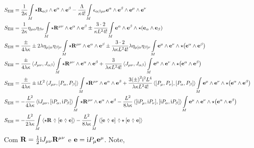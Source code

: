 \begin{align*}
    S_{\textnormal{EH}}&=\frac{1}{2\kappa}\int\limits_M\star\vb{R}_{\alpha\beta}\wedge\vb e^\alpha\wedge\vb e^\beta-\frac{\Lambda}{\kappa4!}\int\limits_M\epsilon_{\alpha\beta\mu\nu}\vb e^\alpha\wedge\vb e^\beta\wedge\vb e^\mu\wedge\vb e^\nu\\
    S_{\textnormal{EH}}&=\frac{1}{2\kappa}\eta_{\mu\alpha}\eta_{\beta\nu}\int\limits_M\star\vb{R}^{\mu\nu}\wedge\vb e^\alpha\wedge\vb e^\beta\pm\frac{3\cdot 2}{\kappa L^24!}\int\limits_M\vb e^\alpha\wedge\vb e^\beta\wedge\star\qty(\vb e_\alpha\wedge\vb e_\beta)\\
    S_{\textnormal{EH}}&=\frac{\pm}{4\lambda\kappa}\pm2\lambda\eta_{\mu[\alpha}\eta_{\beta]\nu}\int\limits_M\star\vb{R}^{\mu\nu}\wedge\vb e^\alpha\wedge\vb e^\beta\pm\frac{3\cdot 2}{\lambda\kappa L^24!}\lambda\eta_{\mu[\alpha}\eta_{\beta]\nu}\int\limits_M\vb e^\mu\wedge\vb e^\nu\wedge\star\qty(\vb e^\alpha\wedge\vb e^\beta)\\
    S_{\textnormal{EH}}&=\frac{\pm}{4\lambda\kappa}\expval{J_{\mu\nu},J_{\alpha\beta}}\int\limits_M\star\vb{R}^{\mu\nu}\wedge\vb e^\alpha\wedge\vb e^\beta+\frac{3}{\lambda\kappa L^24!}\expval{J_{\mu\nu},J_{\alpha\beta}}\int\limits_M\vb e^\mu\wedge\vb e^\nu\wedge\star\qty(\vb e^\alpha\wedge\vb e^\beta)\\
    S_{\textnormal{EH}}&=\frac{\pm}{4\lambda\kappa}\pm\im L ^2\expval{J_{\mu\nu},\comm{P_\alpha}{P_\beta}}\int\limits_M\star\vb{R}^{\mu\nu}\wedge\vb e^\alpha\wedge\vb e^\beta+\frac{3\qty(\pm)^2\im^2L^4}{\lambda\kappa L^24!}\expval{\comm{P_\mu}{P_\nu},\comm{P_\alpha}{P_\beta}}\int\limits_M\vb e^\mu\wedge\vb e^\nu\wedge\star\qty(\vb e^\alpha\wedge\vb e^\beta)\\
    S_{\textnormal{EH}}&=-\frac{L^2}{4\lambda\kappa}\expval{\im J_{\mu\nu},\comm{\im P_\alpha}{\im P_\beta}}\int\limits_M\star\vb{R}^{\mu\nu}\wedge\vb e^\alpha\wedge\vb e^\beta-\frac{L^2}{8\lambda\kappa}\expval{\comm{\im P_\mu}{\im P_\nu},\comm{\im P_\alpha}{\im P_\beta}}\int\limits_M\vb e^\mu\wedge\vb e^\nu\wedge\star\qty(\vb e^\alpha\wedge\vb e^\beta)\\
    S_{\textnormal{EH}}&=-\frac{L^2}{2\lambda\kappa}\int\limits_M\expval{\star\vb{R}\ \wedgecomma\ \wedgecomm{\vb e}{\vb e}}-\frac{L^2}{8\lambda\kappa}\int\limits_M\expval{\wedgecomm{\vb e}{\vb e}\ \wedgecomma \star\wedgecomm{\vb e}{\vb e}}
\end{align*}
Com $\vb R=\frac12\textnormal{i} J_{\mu\nu}\vb R^{\mu\nu}$ e $\vb e=\textnormal{i} P_\mu\vb e^\mu$. Note,

